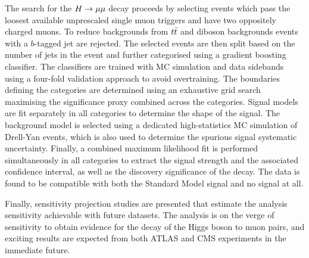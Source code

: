 The search for the $H \rightarrow \mu\mu$ decay proceeds by selecting
events which pass the loosest available unprescaled
single muon triggers and have two oppositely charged
muons. To reduce backgrounds from $t\bar{t}$ and diboson
backgrounds events with a $b$-tagged jet are rejected.
The selected events are then split based on the number
of jets in the event and further categorised using a 
gradient boosting classifier. The classifiers are trained
with MC simulation and data sidebands using a four-fold
validation approach to avoid overtraining. The boundaries
defining the categories are determined using an exhaustive
grid search maximising the significance proxy combined
across the categories. Signal models are fit separately
in all categories to determine the shape of the signal.
The background model is selected using a dedicated
high-statistics MC simulation of Drell-Yan events, which
is also used to determine the spurious signal systematic
uncertainty. Finally, a combined maximum likelihood fit
is performed simultaneously in all categories to
extract the signal strength and the associated confidence
interval, as well as the discovery significance of the
decay. The data is found to be compatible with both the
Standard Model signal and no signal at all.

Finally, sensitivity projection studies are presented
that estimate the analysis sensitivity achievable
with future datasets. The analysis is on the verge of
sensitivity to obtain evidence for the decay of the 
Higgs boson to muon pairs, and exciting results are
expected from both ATLAS and CMS experiments in the 
immediate future.






